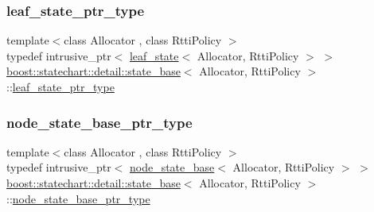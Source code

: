 \mbox{\label{classboost_1_1statechart_1_1detail_1_1state__base_a80b7d62ba0bb8e4fbef3e2e76e2a6021}} 
\subsubsection{\texorpdfstring{leaf\+\_\+state\+\_\+ptr\+\_\+type}{leaf\_state\_ptr\_type}}
{\footnotesize\ttfamily template$<$class Allocator , class Rtti\+Policy $>$ \\
typedef intrusive\+\_\+ptr$<$ \mbox{\hyperlink{classboost_1_1statechart_1_1detail_1_1leaf__state}{leaf\+\_\+state}}$<$ Allocator, Rtti\+Policy $>$ $>$ \mbox{\hyperlink{classboost_1_1statechart_1_1detail_1_1state__base}{boost\+::statechart\+::detail\+::state\+\_\+base}}$<$ Allocator, Rtti\+Policy $>$\+::\mbox{\hyperlink{classboost_1_1statechart_1_1detail_1_1state__base_a80b7d62ba0bb8e4fbef3e2e76e2a6021}{leaf\+\_\+state\+\_\+ptr\+\_\+type}}}

\mbox{\label{classboost_1_1statechart_1_1detail_1_1state__base_a8e3dd0f80bf95d7df21417a50f1dbaa1}} 
\subsubsection{\texorpdfstring{node\+\_\+state\+\_\+base\+\_\+ptr\+\_\+type}{node\_state\_base\_ptr\_type}}
{\footnotesize\ttfamily template$<$class Allocator , class Rtti\+Policy $>$ \\
typedef intrusive\+\_\+ptr$<$ \mbox{\hyperlink{classboost_1_1statechart_1_1detail_1_1node__state__base}{node\+\_\+state\+\_\+base}}$<$ Allocator, Rtti\+Policy $>$ $>$ \mbox{\hyperlink{classboost_1_1statechart_1_1detail_1_1state__base}{boost\+::statechart\+::detail\+::state\+\_\+base}}$<$ Allocator, Rtti\+Policy $>$\+::\mbox{\hyperlink{classboost_1_1statechart_1_1detail_1_1state__base_a8e3dd0f80bf95d7df21417a50f1dbaa1}{node\+\_\+state\+\_\+base\+\_\+ptr\+\_\+type}}}

